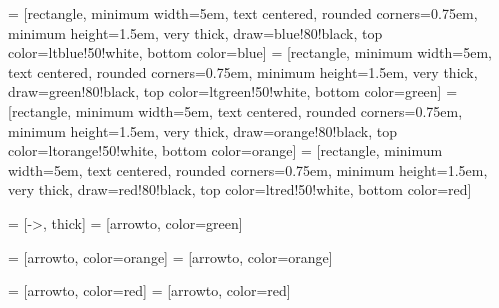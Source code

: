
\usetikzlibrary{arrows,shapes}
 = [rectangle, 
                      minimum width=5em, 
                      text centered,
                      rounded corners=0.75em,
                      minimum height=1.5em,
                      very thick,
                      draw=blue!80!black,
                      top color=ltblue!50!white,
                      bottom color=blue]
 = [rectangle, 
                      minimum width=5em, 
                      text centered,
                      rounded corners=0.75em,
                      minimum height=1.5em,
                      very thick,
                      draw=green!80!black,
                      top color=ltgreen!50!white,
                      bottom color=green]
 = [rectangle, 
                      minimum width=5em, 
                      text centered,
                      rounded corners=0.75em,
                      minimum height=1.5em,
                      very thick,
                      draw=orange!80!black,
                      top color=ltorange!50!white,
                      bottom color=orange]
 = [rectangle, 
                      minimum width=5em, 
                      text centered,
                      rounded corners=0.75em,
                      minimum height=1.5em,
                      very thick,
                      draw=red!80!black,
                      top color=ltred!50!white,
                      bottom color=red]

 = [->, thick]
 = [arrowto, color=green]

 = [arrowto, color=orange]
 = [arrowto, color=orange]

 = [arrowto, color=red]
 = [arrowto, color=red]

